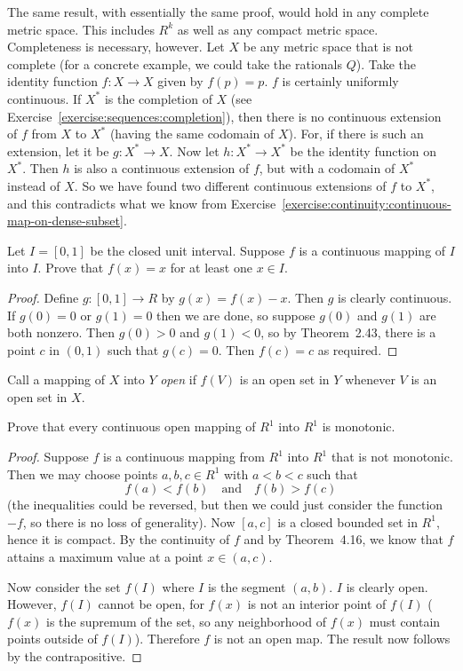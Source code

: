 \begin{solution}
  The same result, with essentially the same proof, would hold in any
  complete metric space. This includes $R^k$ as well as any compact
  metric space. Completeness is necessary, however. Let $X$ be any
  metric space that is not complete (for a concrete example, we could
  take the rationals $Q$). Take the identity function $f\colon X\to X$
  given by $f(p) = p$. $f$ is certainly uniformly continuous. If $X^*$
  is the completion of $X$ (see
  Exercise~\ref{exercise:sequences:completion}), then there is no
  continuous extension of $f$ from $X$ to $X^*$ (having the same
  codomain of $X$). For, if there is such an extension, let it be
  $g\colon X^*\to X$. Now let $h\colon X^*\to X^*$ be the identity
  function on $X^*$. Then $h$ is also a continuous extension of $f$,
  but with a codomain of $X^*$ instead of $X$. So we have found two
  different continuous extensions of $f$ to $X^*$, and this
  contradicts what we know from
  Exercise~\ref{exercise:continuity:continuous-map-on-dense-subset}.
\end{solution}

 Let $I = [0,1]$ be the closed unit interval. Suppose $f$
is a continuous mapping of $I$ into $I$. Prove that $f(x) = x$ for at
least one $x\in I$.
\begin{proof}
  Define $g\colon[0,1]\to R$ by $g(x) = f(x) - x$. Then $g$ is clearly
  continuous. If $g(0) = 0$ or $g(1) = 0$ then we are done, so suppose
  $g(0)$ and $g(1)$ are both nonzero. Then $g(0) > 0$ and $g(1) < 0$,
  so by Theorem~2.43, there is a point $c$ in $(0,1)$ such that
  $g(c) = 0$. Then $f(c) = c$ as required.
\end{proof}

 Call a mapping of $X$ into $Y$ {\em open} if $f(V)$ is
an open set in $Y$ whenever $V$ is an open set in $X$.

Prove that every continuous open mapping of $R^1$ into $R^1$ is
monotonic.
\begin{proof}
  Suppose $f$ is a continuous mapping from $R^1$ into $R^1$ that is
  not monotonic. Then we may choose points $a,b,c\in R^1$ with
  $a < b < c$ such that
  \begin{equation*}
    f(a) < f(b)
    \quad\text{and}\quad
    f(b) > f(c)
  \end{equation*}
  (the inequalities could be reversed, but then we could just consider
  the function $-f$, so there is no loss of generality). Now $[a,c]$
  is a closed bounded set in $R^1$, hence it is compact. By the
  continuity of $f$ and by Theorem~4.16, we know that $f$ attains a
  maximum value at a point $x\in(a,c)$.

  Now consider the set $f(I)$ where $I$ is the segment $(a,b)$. $I$ is
  clearly open. However, $f(I)$ cannot be open, for $f(x)$ is not an
  interior point of $f(I)$ ($f(x)$ is the supremum of the set, so any
  neighborhood of $f(x)$ must contain points outside of
  $f(I)$). Therefore $f$ is not an open map. The result now follows by
  the contrapositive.
\end{proof}

